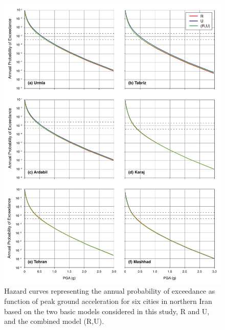 \begin{figure}[th!]
    \centering
    \includegraphics[width=\textwidth]{figures/pdf/figure-11} 
    \caption{Hazard curves representing the annual probability of exceedance as function of peak ground acceleration for six cities in northern Iran based on the two basic models considered in this study, R and U, and the combined model (R,U). }
    \label{fig:hazardcurve}
\end{figure}


